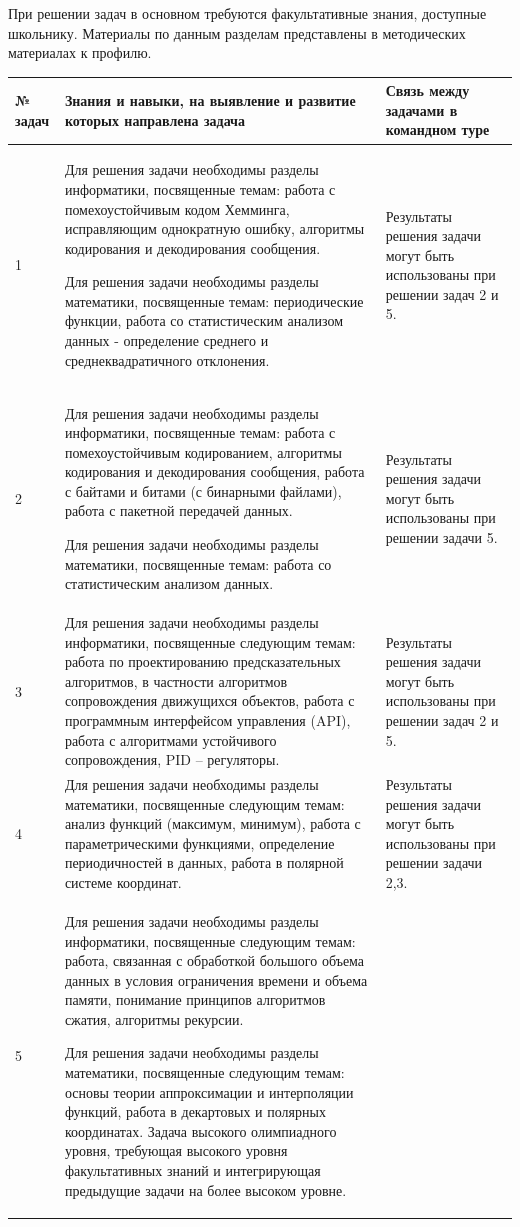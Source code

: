 При решении задач в основном требуются факультативные знания, доступные школьнику. Материалы по данным разделам представлены в методических материалах к профилю.

\begin{center}
\small
\begin{longtable}{|p{2cm}|p{10cm}|p{3cm}|}
\hline
\textbf{№ задач}&\textbf{Знания и навыки, на выявление и развитие которых направлена задача}& \textbf{Связь между задачами в командном туре} \\
\hline
1& Для решения задачи необходимы разделы информатики, посвященные темам: работа с помехоустойчивым кодом Хемминга, исправляющим однократную ошибку, алгоритмы кодирования и декодирования сообщения. 

Для решения задачи необходимы разделы математики, посвященные темам: периодические функции, работа со статистическим анализом данных - определение среднего и среднеквадратичного отклонения.& Результаты решения задачи могут быть использованы при решении задач 2 и 5. \\
\hline
2& Для решения задачи необходимы разделы информатики, посвященные темам: работа с помехоустойчивым кодированием, алгоритмы кодирования и декодирования сообщения, работа с байтами и битами (с бинарными файлами), работа с пакетной передачей данных. 

Для решения задачи необходимы разделы математики, посвященные темам: работа со статистическим анализом данных.& Результаты решения задачи могут быть использованы при решении задачи 5. \\
\hline
3& Для решения задачи необходимы разделы информатики, посвященные следующим темам: работа по проектированию предсказательных алгоритмов, в частности алгоритмов сопровождения движущихся объектов, работа с программным интерфейсом управления (API), работа с алгоритмами устойчивого сопровождения, PID – регуляторы.& Результаты решения задачи могут быть использованы при решении задач 2 и 5. \\
\hline
4& Для решения задачи необходимы разделы математики, посвященные следующим темам: анализ функций (максимум, минимум), работа с параметрическими функциями, определение периодичностей в данных, работа в полярной системе координат.& Результаты решения задачи могут быть использованы при решении задачи 2,3.\\
\hline
5& Для решения задачи необходимы разделы информатики, посвященные следующим темам: работа, связанная с обработкой большого объема данных в условия ограничения времени и объема памяти, понимание принципов алгоритмов сжатия, алгоритмы рекурсии.

Для решения задачи необходимы разделы математики, посвященные следующим темам: основы теории аппроксимации и интерполяции функций, работа в декартовых и полярных координатах.
Задача высокого олимпиадного уровня, требующая высокого уровня факультативных знаний и интегрирующая предыдущие задачи на более высоком уровне.& \\
\hline
\end{longtable}
\end{center}

\clearpage
\endgroup